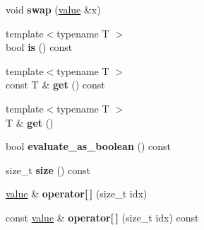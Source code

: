 \begin{DoxyCompactItemize}
\item 
void {\bfseries swap} (\hyperlink{classpangolin_1_1json_1_1value}{value} \&x)\hypertarget{classpangolin_1_1json_1_1value_aaf64e14a2af6864ac6ffaabca752d025}{}\label{classpangolin_1_1json_1_1value_aaf64e14a2af6864ac6ffaabca752d025}

\item 
{\footnotesize template$<$typename T $>$ }\\bool {\bfseries is} () const \hypertarget{classpangolin_1_1json_1_1value_abac38be098c094e64cbb53cccd04866e}{}\label{classpangolin_1_1json_1_1value_abac38be098c094e64cbb53cccd04866e}

\item 
{\footnotesize template$<$typename T $>$ }\\const T \& {\bfseries get} () const \hypertarget{classpangolin_1_1json_1_1value_a86fadab0278acc0919e891282ad450e1}{}\label{classpangolin_1_1json_1_1value_a86fadab0278acc0919e891282ad450e1}

\item 
{\footnotesize template$<$typename T $>$ }\\T \& {\bfseries get} ()\hypertarget{classpangolin_1_1json_1_1value_a7292113142d8cf02d2b389937ff16e02}{}\label{classpangolin_1_1json_1_1value_a7292113142d8cf02d2b389937ff16e02}

\item 
bool {\bfseries evaluate\+\_\+as\+\_\+boolean} () const \hypertarget{classpangolin_1_1json_1_1value_a36613acd0d644c2bca1618bdfc6d3ff6}{}\label{classpangolin_1_1json_1_1value_a36613acd0d644c2bca1618bdfc6d3ff6}

\item 
size\+\_\+t {\bfseries size} () const \hypertarget{classpangolin_1_1json_1_1value_a64eea04ca16d3be156aae8a3d75a1245}{}\label{classpangolin_1_1json_1_1value_a64eea04ca16d3be156aae8a3d75a1245}

\item 
\hyperlink{classpangolin_1_1json_1_1value}{value} \& {\bfseries operator\mbox{[}$\,$\mbox{]}} (size\+\_\+t idx)\hypertarget{classpangolin_1_1json_1_1value_a2fd1d1e12b280502c1d7a0830a980e0b}{}\label{classpangolin_1_1json_1_1value_a2fd1d1e12b280502c1d7a0830a980e0b}

\item 
const \hyperlink{classpangolin_1_1json_1_1value}{value} \& {\bfseries operator\mbox{[}$\,$\mbox{]}} (size\+\_\+t idx) const \hypertarget{classpangolin_1_1json_1_1value_a27799bda0c2c9f5d9179c74fe3e6cfb4}{}\label{classpangolin_1_1json_1_1value_a27799bda0c2c9f5d9179c74fe3e6cfb4}


\end{DoxyCompactItemize}
